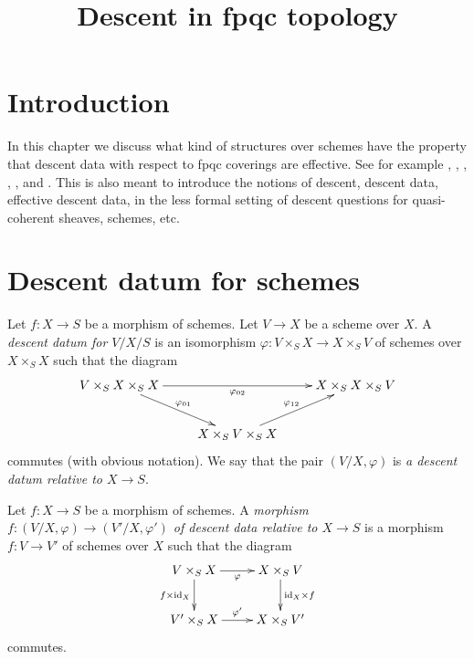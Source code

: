 

%


\title{Descent in fpqc topology}

\maketitle

\tableofcontents

\section{Introduction}
\label{section-introduction}

\noindent
In this chapter we discuss what kind of structures over schemes
have the property that descent data with respect to fpqc coverings
are effective. See for example \cite{Gr-I}, \cite{Gr-II}, \cite{Gr-III},
\cite{Gr-IV}, \cite{Gr-V}, and \cite{Gr-VI}.
This is also meant to introduce the notions of
descent, descent data, effective descent data, in the less formal
setting of descent questions for quasi-coherent sheaves, schemes, etc.


\section{Descent datum for schemes}
\label{section-descent-datum}

\begin{definition}
\label{definition-descent-datum}
Let $f : X \to S$ be a morphism of schemes.
Let $V \to X$ be a scheme over $X$.
A {\it descent datum for $V/X/S$} is an isomorphism
$\varphi : V \times_S X \to X \times_S V$ of schemes over
$X \times_S X$ such that the diagram
$$
\xymatrix{
V \times_S X \times_S X \ar[rd]^{\varphi_{01}} \ar[rr]_{\varphi_{02}} &
&
X \times_S X \times_S V\\
&
X \times_S V \times_S X \ar[ru]^{\varphi_{12}}
}
$$
commutes (with obvious notation).
We say that the pair $(V/X, \varphi)$ is
{\it a descent datum relative to $X \to S$}.
\end{definition}

\begin{definition}
\label{definition-morphism-descent-data}
Let $f : X \to S$ be a morphism of schemes.
A {\it morphism $f : (V/X, \varphi) \to (V'/X, \varphi')$ of
descent data relative to $X \to S$} is a morphism
$f : V \to V'$ of schemes over $X$ such that 
the diagram
$$
\xymatrix{
V \times_S X \ar[r]_{\varphi} \ar[d]_{f \times \text{id}_X} &
X \times_S V \ar[d]^{\text{id}_X \times f} \\
V' \times_S X \ar[r]^{\varphi'} & X \times_S V'
}
$$
commutes.
\end{definition}

